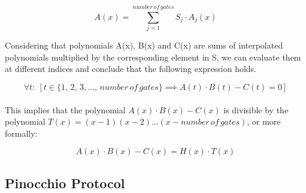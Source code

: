 $$ A(x) = \sum_{j = 1}^{number\,of\,gates} S_j \cdot A_j(x) $$

\noindent Considering that polynomials A(x), B(x) and C(x) are sums of interpolated polynomials multiplied by the corresponding element in S, we can evaluate them at different indices and conclude that the following expression holds.

$$\forall t:\: [t \in \{1,\,2,\,3, \dots ,\,number\,of\,gates\} \implies A(t) \cdot B(t) - C(t) = 0]$$
\\
\noindent This implies that the polynomial $A(x) \cdot B(x) - C(x)$ is divisible by the polynomial $T(x) = (x-1)(x-2)...(x-number\,of\,gates)$, or more formally:

$$ A(x) \cdot B(x) - C(x) = H(x) \cdot T(x) $$

\subsection{Pinocchio Protocol}

